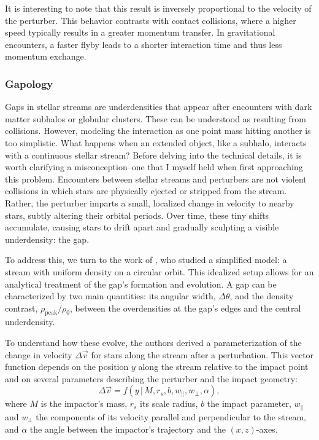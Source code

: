         It is interesting to note that this result is inversely proportional to the velocity of the perturber. This behavior contrasts with contact collisions, where a higher speed typically results in a greater momentum transfer. In gravitational encounters, a faster flyby leads to a shorter interaction time and thus less momentum exchange.

        \subsubsection{Gapology}
            Gaps in stellar streams are underdensities that appear after encounters with dark matter subhalos or globular clusters. These can be understood as resulting from collisions. However, modeling the interaction as one point mass hitting another is too simplistic. What happens when an extended object, like a subhalo, interacts with a continuous stellar stream? Before delving into the technical details, it is worth clarifying a misconception--one that I myself held when first approaching this problem. Encounters between stellar streams and perturbers are not violent collisions in which stars are physically ejected or stripped from the stream. Rather, the perturber imparts a small, localized change in velocity to nearby stars, subtly altering their orbital periods. Over time, these tiny shifts accumulate, causing stars to drift apart and gradually sculpting a visible underdensity: the gap. 
            
            To address this, we turn to the work of \citet{2015MNRAS.450.1136E}, who studied a simplified model: a stream with uniform density on a circular orbit. This idealized setup allows for an analytical treatment of the gap's formation and evolution. A gap can be characterized by two main quantities: its angular width, $\Delta \theta$, and the density contrast, $\rho_{\mathrm{peak}}/\rho_0$, between the overdensities at the gap's edges and the central underdensity.


            To understand how these evolve, the authors derived a parameterization of the change in velocity $\Delta \vec{v}$ for stars along the stream after a perturbation. This vector function depends on the position $y$ along the stream relative to the impact point and on several parameters describing the perturber and the impact geometry:
            \[
            \Delta \vec{v} = f(y \,|\, M, r_s, b, w_\parallel, w_\perp, \alpha),
            \]
            where $M$ is the impactor's mass, $r_s$ its scale radius, $b$ the impact parameter, $w_\parallel$ and $w_\perp$ the components of its velocity parallel and perpendicular to the stream, and $\alpha$ the angle between the impactor's trajectory and the $(x,z)$-axes.

